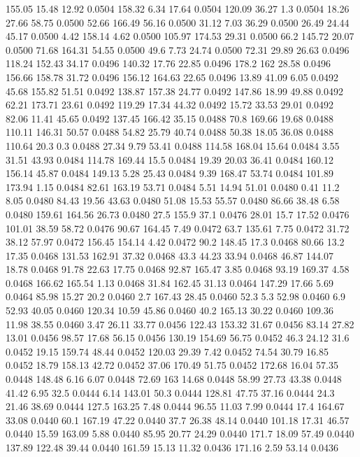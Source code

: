 155.05	15.48	12.92	0.0504
158.32	6.34	17.64	0.0504
120.09	36.27	1.3	0.0504
18.26	27.66	58.75	0.0500
52.66	166.49	56.16	0.0500
31.12	7.03	36.29	0.0500
26.49	24.44	45.17	0.0500
4.42	158.14	4.62	0.0500
105.97	174.53	29.31	0.0500
66.2	145.72	20.07	0.0500
71.68	164.31	54.55	0.0500
49.6	7.73	24.74	0.0500
72.31	29.89	26.63	0.0496
118.24	152.43	34.17	0.0496
140.32	17.76	22.85	0.0496
178.2	162	28.58	0.0496
156.66	158.78	31.72	0.0496
156.12	164.63	22.65	0.0496
13.89	41.09	6.05	0.0492
45.68	155.82	51.51	0.0492
138.87	157.38	24.77	0.0492
147.86	18.99	49.88	0.0492
62.21	173.71	23.61	0.0492
119.29	17.34	44.32	0.0492
15.72	33.53	29.01	0.0492
82.06	11.41	45.65	0.0492
137.45	166.42	35.15	0.0488
70.8	169.66	19.68	0.0488
110.11	146.31	50.57	0.0488
54.82	25.79	40.74	0.0488
50.38	18.05	36.08	0.0488
110.64	20.3	0.3	0.0488
27.34	9.79	53.41	0.0488
114.58	168.04	15.64	0.0484
3.55	31.51	43.93	0.0484
114.78	169.44	15.5	0.0484
19.39	20.03	36.41	0.0484
160.12	156.14	45.87	0.0484
149.13	5.28	25.43	0.0484
9.39	168.47	53.74	0.0484
101.89	173.94	1.15	0.0484
82.61	163.19	53.71	0.0484
5.51	14.94	51.01	0.0480
0.41	11.2	8.05	0.0480
84.43	19.56	43.63	0.0480
51.08	15.53	55.57	0.0480
86.66	38.48	6.58	0.0480
159.61	164.56	26.73	0.0480
27.5	155.9	37.1	0.0476
28.01	15.7	17.52	0.0476
101.01	38.59	58.72	0.0476
90.67	164.45	7.49	0.0472
63.7	135.61	7.75	0.0472
31.72	38.12	57.97	0.0472
156.45	154.14	4.42	0.0472
90.2	148.45	17.3	0.0468
80.66	13.2	17.35	0.0468
131.53	162.91	37.32	0.0468
43.3	44.23	33.94	0.0468
46.87	144.07	18.78	0.0468
91.78	22.63	17.75	0.0468
92.87	165.47	3.85	0.0468
93.19	169.37	4.58	0.0468
166.62	165.54	1.13	0.0468
31.84	162.45	31.13	0.0464
147.29	17.66	5.69	0.0464
85.98	15.27	20.2	0.0460
2.7	167.43	28.45	0.0460
52.3	5.3	52.98	0.0460
6.9	52.93	40.05	0.0460
120.34	10.59	45.86	0.0460
40.2	165.13	30.22	0.0460
109.36	11.98	38.55	0.0460
3.47	26.11	33.77	0.0456
122.43	153.32	31.67	0.0456
83.14	27.82	13.01	0.0456
98.57	17.68	56.15	0.0456
130.19	154.69	56.75	0.0452
46.3	24.12	31.6	0.0452
19.15	159.74	48.44	0.0452
120.03	29.39	7.42	0.0452
74.54	30.79	16.85	0.0452
18.79	158.13	42.72	0.0452
37.06	170.49	51.75	0.0452
172.68	16.04	57.35	0.0448
148.48	6.16	6.07	0.0448
72.69	163	14.68	0.0448
58.99	27.73	43.38	0.0448
41.42	6.95	32.5	0.0444
6.14	143.01	50.3	0.0444
128.81	47.75	37.16	0.0444
24.3	21.46	38.69	0.0444
127.5	163.25	7.48	0.0444
96.55	11.03	7.99	0.0444
17.4	164.67	33.08	0.0440
60.1	167.19	47.22	0.0440
37.7	26.38	48.14	0.0440
101.18	17.31	46.57	0.0440
15.59	163.09	5.88	0.0440
85.95	20.77	24.29	0.0440
171.7	18.09	57.49	0.0440
137.89	122.48	39.44	0.0440
161.59	15.13	11.32	0.0436
171.16	2.59	53.14	0.0436

